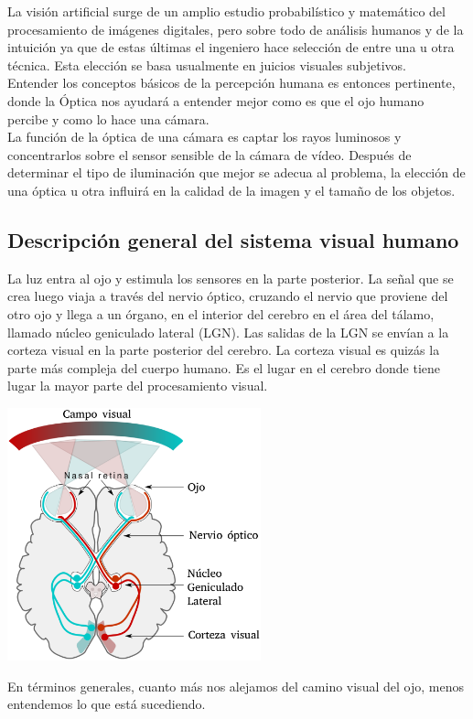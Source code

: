 La visión artificial surge de un amplio estudio probabilístico y matemático del
procesamiento de imágenes digitales, pero sobre todo de análisis humanos y de la
intuición ya que de estas últimas el ingeniero hace selección de entre una u otra
técnica. Esta elección se basa usualmente en juicios visuales subjetivos.\\
Entender los conceptos básicos de la percepción humana es entonces pertinente, donde
la Óptica nos ayudará a entender mejor como es que el ojo humano percibe y como lo
hace una cámara. \\
La función de la óptica de una cámara es captar los rayos luminosos y concentrarlos
sobre el sensor sensible de la cámara de vídeo. Después de determinar el tipo de
iluminación que mejor se adecua al problema, la elección de una óptica u otra influirá
en la calidad de la imagen y el tamaño de los objetos.

\subsection{Descripción general del sistema visual humano}
La luz entra al ojo y estimula los sensores en la parte posterior.
La señal que se crea luego viaja a través del nervio óptico, cruzando el
nervio que proviene del otro ojo y llega a un órgano, en el interior del
cerebro en el área del tálamo, llamado núcleo geniculado lateral (LGN).
Las salidas de la LGN se envían a la corteza visual en la parte posterior del cerebro.
La corteza visual es quizás la parte más compleja del cuerpo humano. Es el lugar en el
cerebro donde tiene lugar la mayor parte del procesamiento visual.\cite{Book:Anil2008}
\begin{center}
	\includegraphics[width=0.55\textwidth]{Contenido/Cuerpo/Capitulo2/Fig1_1.eps}
	\label{fig:MarcoTeorico:Fig2}
\end{center}
En términos generales, cuanto más nos alejamos del camino visual del ojo, menos
entendemos lo que está sucediendo.

